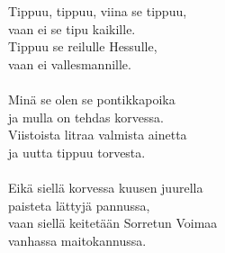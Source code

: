 
            Tippuu, tippuu, viina se tippuu, \\
            vaan ei se tipu kaikille. \\
            Tippuu se reilulle Hessulle, \\
            vaan ei vallesmannille. \\
\hspace{10mm} \\
            Minä se olen se pontikkapoika \\
            ja mulla on tehdas korvessa. \\
            Viistoista litraa valmista ainetta \\
            ja uutta tippuu torvesta. \\
\hspace{10mm} \\
            Eikä siellä korvessa kuusen juurella \\
            paisteta lättyjä pannussa, \\
            vaan siellä keitetään Sorretun Voimaa \\
            vanhassa maitokannussa. \\
